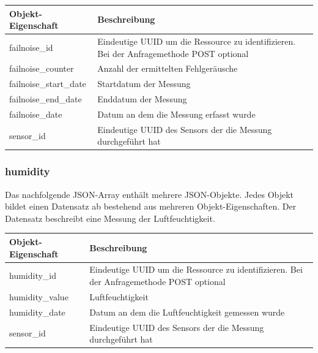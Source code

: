\begin{table}[H]
  \begin{tabularx}{\textwidth}{lX}
    \textbf{Objekt-Eigenschaft} & \textbf{Beschreibung} \\ \toprule
    failnoise\_id               & Eindeutige UUID um die Ressource zu identifizieren. Bei der Anfragemethode POST optional  \\
    failnoise\_counter          & Anzahl der ermittelten Fehlgeräusche  \\
    failnoise\_start\_date      & Startdatum der Messung  \\
    failnoise\_end\_date        & Enddatum der Messung  \\
    failnoise\_date             & Datum an dem die Messung erfasst wurde \\
    sensor\_id                  & Eindeutige UUID des Sensors der die Messung durchgeführt hat
  \end{tabularx}
\end{table}

\subsubsection{humidity}%
\label{sec:rest.json.humidity}
Das nachfolgende JSON-Array enthält mehrere JSON-Objekte. Jedes Objekt bildet einen Datensatz ab bestehend aus mehreren Objekt-Eigenschaften. Der Datensatz beschreibt eine Messung der Luftfeuchtigkeit.

\begin{jsoncode}
\end{jsoncode}

\begin{table}[H]
  \begin{tabularx}{\textwidth}{lX}
    \textbf{Objekt-Eigenschaft} & \textbf{Beschreibung} \\ \toprule
    humidity\_id                & Eindeutige UUID um die Ressource zu identifizieren. Bei der Anfragemethode POST optional  \\
    humidity\_value             & Luftfeuchtigkeit   \\
    humidity\_date              & Datum an dem die Luftfeuchtigkeit gemessen wurde  \\
    sensor\_id                  & Eindeutige UUID des Sensors der die Messung durchgeführt hat
  \end{tabularx}
\end{table}

